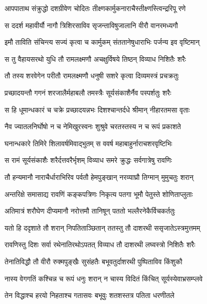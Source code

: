 \twolineshloka
{आपपाताथ संक्रुद्धो दशग्रीवेण चोदितः}
{तीक्ष्णकार्मुकनाराचैस्तीक्ष्णस्त्विन्द्ररिपू रणे} %

\twolineshloka
{स ददर्श महावीर्यौ नागौ त्रिशिरसाविव}
{सृजन्ताविषुजालानि वीरौ वानरमध्यगौ} %

\twolineshloka
{इमौ ताविति संचिन्त्य सज्यं कृत्वा च कार्मुकम्}
{संततानेषुधाराभिः पर्जन्य इव वृष्टिमान्} %

\twolineshloka
{स तु वैहायसरथो युधि तौ रामलक्ष्मणौ}
{अचक्षुर्विषये तिष्ठन् विव्याध निशितैः शरैः} %

\twolineshloka
{तौ तस्य शरवेगेन परीतौ रामलक्ष्मणौ}
{धनुषी सशरे कृत्वा दिव्यमस्त्रं प्रचक्रतुः} %

\twolineshloka
{प्रच्छादयन्तौ गगनं शरजालैर्महाबलौ}
{तमस्त्रैः सूर्यसंकाशैर्नैव पस्पर्शतुः शरैः} %

\twolineshloka
{स हि धूमान्धकारं च चक्रे प्रच्छादयन्नभः}
{दिशश्चान्तर्दधे श्रीमान् नीहारतमसा वृताः} %

\twolineshloka
{नैव ज्यातलनिर्घोषो न च नेमिखुरस्वनः}
{शुश्रुवे चरतस्तस्य न च रूपं प्रकाशते} %

\twolineshloka
{घनान्धकारे तिमिरे शिलावर्षमिवाद्भुतम्}
{स ववर्ष महाबाहुर्नाराचशरवृष्टिभिः} %

\twolineshloka
{स रामं सूर्यसंकाशैः शरैर्दत्तवरैर्भृशम्}
{विव्याध समरे क्रुद्धः सर्वगात्रेषु रावणिः} %

\twolineshloka
{तौ हन्यमानौ नाराचैर्धाराभिरिव पर्वतौ}
{हेमपुङ्खान् नरव्याघ्रौ तिग्मान् मुमुचतुः शरान्} %

\twolineshloka
{अन्तरिक्षे समासाद्य रावणिं कङ्कपत्रिणः}
{निकृत्य पतगा भूमौ पेतुस्ते शोणिताप्लुताः} %

\twolineshloka
{अतिमात्रं शरौघेण दीप्यमानौ नरोत्तमौ}
{तानिषून् पततो भल्लैरनेकैर्विचकर्ततुः} %

\twolineshloka
{यतो हि ददृशाते तौ शरान् निपतिताञ्छितान्}
{ततस्तु तौ दाशरथी ससृजातेऽस्त्रमुत्तमम्} %

\twolineshloka
{रावणिस्तु दिशः सर्वा रथेनातिरथोऽपतत्}
{विव्याध तौ दाशरथी लघ्वस्त्रो निशितैः शरैः} %

\twolineshloka
{तेनातिविद्धौ तौ वीरौ रुक्मपुङ्खैः सुसंहतैः}
{बभूवतुर्दाशरथी पुष्पिताविव किंशुकौ} %

\twolineshloka
{नास्य वेगगतिं कश्चिन्न च रूपं धनुः शरान्}
{न चास्य विदितं किंचित् सूर्यस्येवाभ्रसम्प्लवे} %

\twolineshloka
{तेन विद्धाश्च हरयो निहताश्च गतासवः}
{बभूवुः शतशस्तत्र पतिता धरणीतले} %

